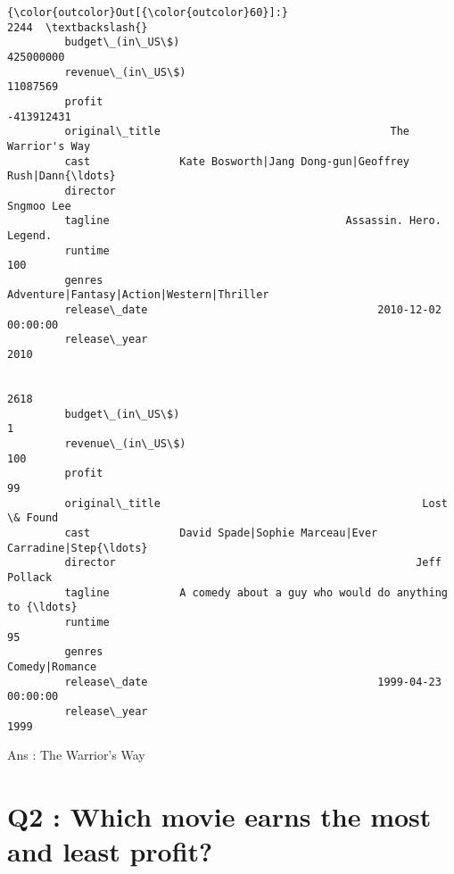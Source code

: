 \documentclass[11pt]{article}
\begin{document}
\begin{Verbatim}[commandchars=\\\{\}]
{\color{outcolor}Out[{\color{outcolor}60}]:}                                                                2244  \textbackslash{}
         budget\_(in\_US\$)                                           425000000   
         revenue\_(in\_US\$)                                           11087569   
         profit                                                   -413912431   
         original\_title                                    The Warrior's Way   
         cast              Kate Bosworth|Jang Dong-gun|Geoffrey Rush|Dann{\ldots}   
         director                                                 Sngmoo Lee   
         tagline                                     Assassin. Hero. Legend.   
         runtime                                                         100   
         genres                    Adventure|Fantasy|Action|Western|Thriller   
         release\_date                                    2010-12-02 00:00:00   
         release\_year                                                   2010   
         
                                                                        2618  
         budget\_(in\_US\$)                                                   1  
         revenue\_(in\_US\$)                                                100  
         profit                                                           99  
         original\_title                                         Lost \& Found  
         cast              David Spade|Sophie Marceau|Ever Carradine|Step{\ldots}  
         director                                               Jeff Pollack  
         tagline           A comedy about a guy who would do anything to {\ldots}  
         runtime                                                          95  
         genres                                               Comedy|Romance  
         release\_date                                    1999-04-23 00:00:00  
         release\_year                                                   1999  
\end{Verbatim}
            
    Ans : The Warrior's Way

    \section{Q2 : Which movie earns the most and least
profit?}\label{q2-which-movie-earns-the-most-and-least-profit}
\end{document}
